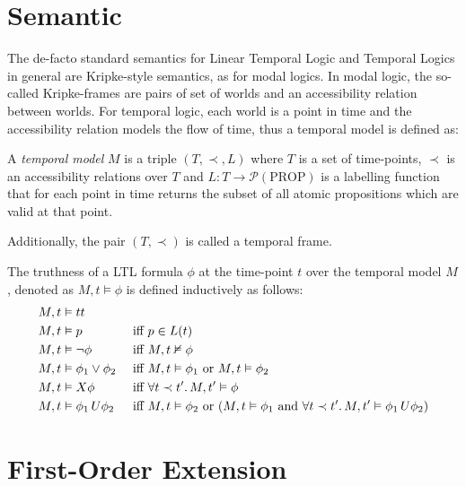 \section{Semantic}

The de-facto standard semantics for Linear Temporal Logic and Temporal Logics in general are Kripke-style semantics, as
for modal logics. In modal logic, the so-called Kripke-frames are pairs of set of worlds and an accessibility relation
between worlds. For temporal logic, each world is a point in time and the accessibility relation models the flow of
time, thus a temporal model is defined as:

\begin{definition}
  A \emph{temporal model} $M$ is a triple $(T, \prec, L)$ where $T$ is a set of time-points, $\prec$ is an accessibility
  relations over $T$ and $L : T \to \mathcal{P}(\text{PROP})$ is a labelling function that for each point in time
  returns the subset of all atomic propositions which are valid at that point.
\end{definition}

Additionally, the pair $(T, \prec)$ is called a temporal frame.

\begin{definition}
  The truthness of a LTL formula $\phi$ at the time-point $t$ over the temporal model $M$, denoted as
  $M, t \vDash \phi$ is defined inductively as follows:
  \begin{align*}
    M, t &\vDash tt && \\
    M, t &\vDash p &&\text{ iff } p \in L(t) \\
    M, t &\vDash \neg\phi &&\text{ iff } M, t \nvDash \phi \\
    M, t &\vDash \phi_1 \lor \phi_2 &&\text{ iff } M, t \vDash \phi_1 \text{ or } M, t \vDash \phi_2 \\
    M, t &\vDash X{\phi} &&\text{ iff } \forall {t \prec t'} \ldotp {M, t' \vDash \phi} \\
    M, t &\vDash {\phi_1}\,U {\phi_2} &&\text{ iff } M, t \vDash \phi_2 \text{ or } (M, t \vDash \phi_1 \text{ and }
      \forall {t \prec t'} \ldotp {M, t' \vDash {\phi_1}\,U {\phi_2}})
  \end{align*}
\end{definition}

\section{First-Order Extension}

